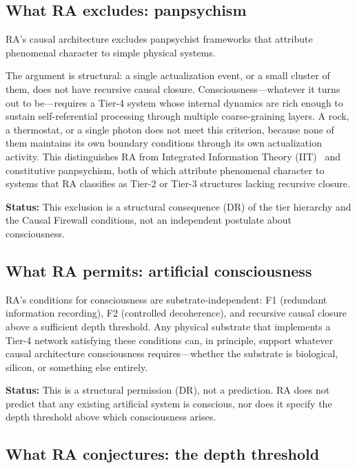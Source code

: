 \documentclass[11pt]{article}
\begin{document}
\subsection{What RA excludes: panpsychism}

RA's causal architecture excludes panpsychist frameworks that attribute phenomenal character to simple physical systems.

The argument is structural: a single actualization event, or a small cluster of them, does not have recursive causal closure. Consciousness---whatever it turns out to be---requires a Tier-4 system whose internal dynamics are rich enough to sustain self-referential processing through multiple coarse-graining layers. A rock, a thermostat, or a single photon does not meet this criterion, because none of them maintains its own boundary conditions through its own actualization activity. This distinguishes RA from Integrated Information Theory (IIT)~\cite{Tononi2016} and constitutive panpsychism, both of which attribute phenomenal character to systems that RA classifies as Tier-2 or Tier-3 structures lacking recursive closure.

\textbf{Status:} This exclusion is a structural consequence (DR) of the tier hierarchy and the Causal Firewall conditions, not an independent postulate about consciousness.

\subsection{What RA permits: artificial consciousness}

RA's conditions for consciousness are substrate-independent: F1 (redundant information recording), F2 (controlled decoherence), and recursive causal closure above a sufficient depth threshold. Any physical substrate that implements a Tier-4 network satisfying these conditions can, in principle, support whatever causal architecture consciousness requires---whether the substrate is biological, silicon, or something else entirely.

\textbf{Status:} This is a structural permission (DR), not a prediction. RA does not predict that any existing artificial system is conscious, nor does it specify the depth threshold above which consciousness arises.

\subsection{What RA conjectures: the depth threshold}
\end{document}
